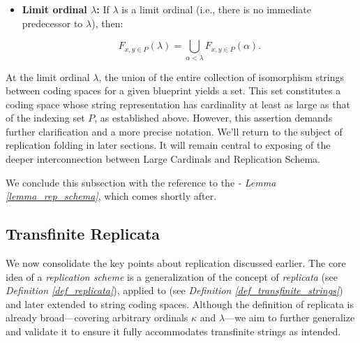 \begin{definition}
\begin{itemize}
        \item \textbf{Limit ordinal \( \lambda \):} If \( \lambda \) is a limit ordinal (i.e., there is no immediate predecessor to \( \lambda \)), then:
        
        \[
            F_{x,y \in P}(\lambda) = \bigcup_{\alpha < \lambda} F_{x,y \in P}(\alpha).
        \]
        
    \end{itemize}
\end{definition}

At the limit ordinal \(\lambda\), the union of the entire collection of isomorphism strings between coding spaces for a given blueprint yields a set. This set constitutes a coding space whose string representation has cardinality at least as large as that of the indexing set \(P\), as established above. However, this assertion demands further clarification and a more precise notation. We'll return to the subject of replication folding in later sections. It will remain central to exposing of the deeper interconnection between Large Cardinals and Replication Schema.

We conclude this subsection with the reference to the \textit{ - Lemma \ref{lemma_rep_schema}}, which comes shortly after.

\subsection{Transfinite Replicata}

We now consolidate the key points about replication discussed earlier. The core idea of a \textit{replication scheme} is a generalization of the concept of \textit{replicata} (see \textit{Definition \ref{def_replicata}}), applied to \textit{} (see \textit{Definition \ref{def_transfinite_strings}}) and later extended to string coding spaces. Although the definition of replicata is already broad—covering arbitrary ordinals $\kappa$ and $\lambda$—we aim to further generalize and validate it to ensure it fully accommodates transfinite strings as intended.

